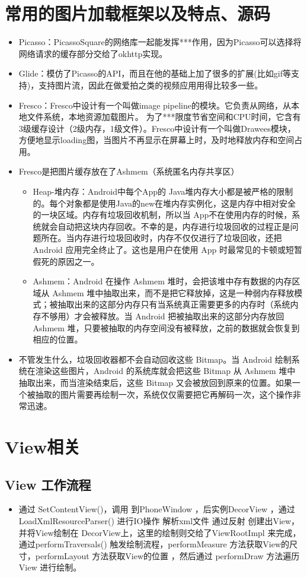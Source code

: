 \documentclass[9pt, b5paper]{article}
\begin{document}
\section{常用的图片加载框架以及特点、源码}
\label{sec-5}
\begin{itemize}
\item Picasso：PicassoSquare的网络库一起能发挥***作用，因为Picasso可以选择将网络请求的缓存部分交给了okhttp实现。
\item Glide：模仿了Picasso的API，而且在他的基础上加了很多的扩展(比如gif等支持)，支持图片流，因此在做爱拍之类的视频应用用得比较多一些。
\item Fresco：Fresco中设计有一个叫做image pipeline的模块。它负责从网络，从本地文件系统，本地资源加载图片。 为了***限度节省空间和CPU时间，它含有3级缓存设计（2级内存，1级文件）。Fresco中设计有一个叫做Drawees模块， 方便地显示loading图，当图片不再显示在屏幕上时，及时地释放内存和空间占用。
\item Fresco是把图片缓存放在了Ashmem（系统匿名内存共享区）
\begin{itemize}
\item Heap-堆内存：Android中每个App的 Java堆内存大小都是被严格的限制的。每个对象都是使用Java的new在堆内存实例化，这是内存中相对安全的一块区域。内存有垃圾回收机制，所以当 App不在使用内存的时候，系统就会自动把这块内存回收。不幸的是，内存进行垃圾回收的过程正是问题所在。当内存进行垃圾回收时，内存不仅仅进行了垃圾回收，还把 Android 应用完全终止了。这也是用户在使用 App 时最常见的卡顿或短暂假死的原因之一。
\item Ashmem：Android 在操作 Ashmem 堆时，会把该堆中存有数据的内存区域从 Ashmem 堆中抽取出来，而不是把它释放掉，这是一种弱内存释放模式；被抽取出来的这部分内存只有当系统真正需要更多的内存时（系统内存不够用）才会被释放。当 Android 把被抽取出来的这部分内存放回 Ashmem 堆，只要被抽取的内存空间没有被释放，之前的数据就会恢复到相应的位置。
\end{itemize}
\item 不管发生什么，垃圾回收器都不会自动回收这些 Bitmap。当 Android 绘制系统在渲染这些图片，Android 的系统库就会把这些 Bitmap 从 Ashmem 堆中抽取出来，而当渲染结束后，这些 Bitmap 又会被放回到原来的位置。如果一个被抽取的图片需要再绘制一次，系统仅仅需要把它再解码一次，这个操作非常迅速。
\end{itemize}

\section{View相关}
\label{sec-6}
\subsection{View 工作流程}
\label{sec-6-1}
\begin{itemize}
\item 通过 SetContentView()，调用 到PhoneWindow ，后实例DecorView ，通过 LoadXmlResourceParser() 进行IO操作 解析xml文件 通过反射 创建出View，并将View绘制在 DecorView上，这里的绘制则交给了ViewRootImpl 来完成，通过performTraversals() 触发绘制流程，performMeasure 方法获取View的尺寸，performLayout 方法获取View的位置 ，然后通过 performDraw 方法遍历View 进行绘制。
\end{itemize}
\end{document}
